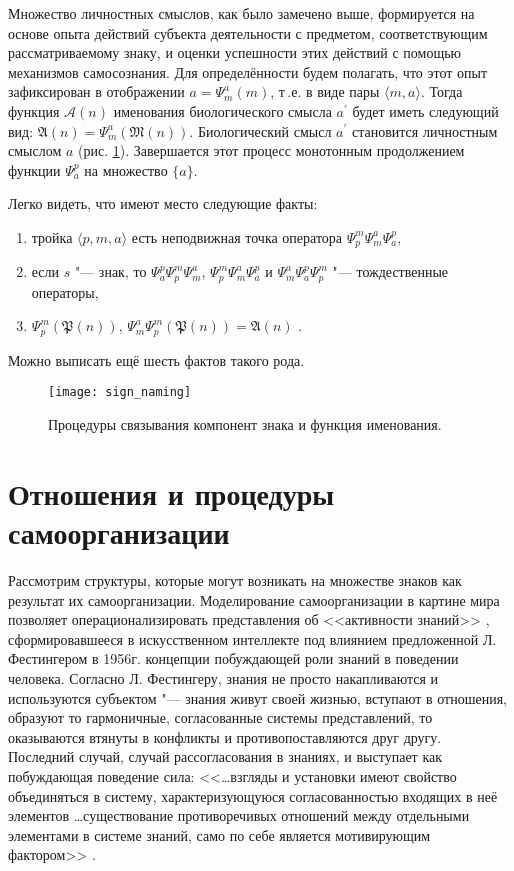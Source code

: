Множество личностных смыслов, как было замечено выше, формируется на основе опыта действий субъекта деятельности с предметом, соответствующим рассматриваемому знаку, и оценки успешности этих действий с помощью механизмов самосознания. Для определённости будем полагать, что этот опыт зафиксирован в отображении $a=\Psi_m^a(m)$, т\,.е. в виде пары $\langle m,a\rangle$. Тогда функция $\mathcal A(n)$ именования биологического смысла $a^\prime$ будет иметь следующий вид: $\mathfrak A(n)=\Psi_m^a(\mathfrak M(n))$. Биологический смысл $a^\prime$ становится личностным смыслом $a$ (рис. \ref{fg:sign_naming}). Завершается этот процесс монотонным продолжением функции $\Psi_a^p$ на множество $\{a\}$.

Легко видеть, что имеют место следующие факты:
\begin{enumerate}
	\item тройка $\langle p,m,a\rangle$ есть неподвижная точка оператора $\Psi_p^m\Psi_m^a\Psi_a^p$,
	\item если $s$ "--- знак, то  $\Psi_a^p\Psi_p^m\Psi_m^a$, $\Psi_p^m\Psi_m^a\Psi_a^p$ и $\Psi_m^a\Psi_a^p\Psi_p^m$ "--- тождественные операторы,
	\item $\Psi_p^m(\mathfrak P(n))$, $\Psi_m^a\Psi_p^m(\mathfrak P(n))=\mathfrak A(n)$ .
\end{enumerate}
Можно выписать ещё шесть фактов такого рода.

\begin{figure}[h]
	\centering
	\texttt{[image: sign\_naming]}
	\caption{Процедуры связывания компонент знака и функция именования.}
	\label{fg:sign_naming}
\end{figure}


\section{Отношения и процедуры самоорганизации} \label{sect2_3}

Рассмотрим структуры, которые могут возникать на множестве знаков как результат их самоорганизации. Моделирование самоорганизации в картине мира позволяет операционализировать представления об <<активности знаний>> \cite{Pospelov2002}, сформировавшееся в искусственном интеллекте под влиянием предложенной Л. Фестингером в 1956г. концепции побуждающей роли знаний в поведении человека. Согласно Л. Фестингеру, знания не просто накапливаются и используются субъектом "--- знания живут своей жизнью, вступают в отношения, образуют то гармоничные, согласованные системы представлений, то оказываются втянуты в конфликты и противопоставляются друг другу. Последний случай, случай рассогласования в знаниях, и выступает как побуждающая поведение сила: <<\dots взгляды и установки имеют свойство объединяться в систему, характеризующуюся согласованностью входящих в неё элементов \dots существование противоречивых отношений между отдельными элементами в системе знаний, само по себе является мотивирующим фактором>> \cite{Festinger1999}.

